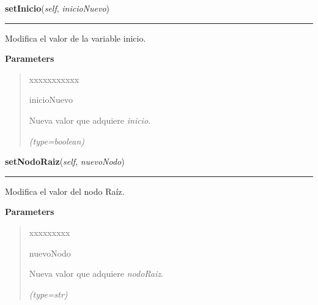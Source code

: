 \hspace{.8\funcindent}\begin{boxedminipage}{\funcwidth}

    \raggedright \textbf{setInicio}(\textit{self}, \textit{inicioNuevo})

    \vspace{-1.5ex}

    \rule{\textwidth}{0.5\fboxrule}
\setlength{\parskip}{2ex}
    Modifica el valor de la variable inicio.

\setlength{\parskip}{1ex}
      \textbf{Parameters}
      \vspace{-1ex}

      \begin{quote}
        \begin{Ventry}{xxxxxxxxxxx}

          \item[inicioNuevo]

          Nueva valor que adquiere \textit{inicio}.

            {\it (type=boolean)}

        \end{Ventry}

      \end{quote}

    \end{boxedminipage}

    \label{grafico:Grafico:setNodoRaiz}

    \vspace{0.5ex}

\hspace{.8\funcindent}\begin{boxedminipage}{\funcwidth}

    \raggedright \textbf{setNodoRaiz}(\textit{self}, \textit{nuevoNodo})

    \vspace{-1.5ex}

    \rule{\textwidth}{0.5\fboxrule}
\setlength{\parskip}{2ex}
    Modifica el valor del nodo Raíz.

\setlength{\parskip}{1ex}
      \textbf{Parameters}
      \vspace{-1ex}

      \begin{quote}
        \begin{Ventry}{xxxxxxxxx}

          \item[nuevoNodo]

          Nueva valor que adquiere \textit{nodoRaiz}.

            {\it (type=str)}

        \end{Ventry}

      \end{quote}

    \end{boxedminipage}

